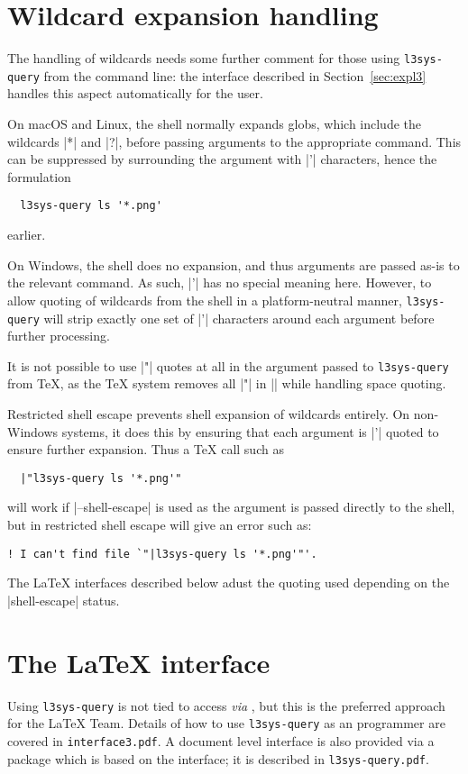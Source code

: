 \documentclass{l3doc}
\begin{document}
\begin{documentation}
\section{Wildcard expansion handling\label{sec:wildcard}}

The handling of wildcards needs some further comment for those using
\texttt{l3sys-query} from the command line: the  interface described
in Section~\ref{sec:expl3} handles this aspect automatically for the user.

On macOS and Linux, the shell normally expands globs, which include the
wildcards |*| and |?|, before passing arguments to the appropriate command.
This can be suppressed by surrounding the argument with |'| characters, hence
the formulation
\begin{verbatim}
  l3sys-query ls '*.png'
\end{verbatim}
earlier.

On Windows, the shell does no expansion, and thus arguments are passed as-is to
the relevant command. As such, |'| has no special meaning here. However, to
allow quoting of wildcards from the shell in a platform-neutral manner,
\texttt{l3sys-query} will strip exactly one set of |'| characters around each
argument before further processing.

It is not possible to use |"| quotes at all in the argument passed to
\texttt{l3sys-query} from \TeX{}, as the \TeX{} system removes all |"| in
|| while handling space quoting.

Restricted shell escape prevents shell expansion of wildcards entirely. On
non-Windows systems, it does this by ensuring that each argument is |'| quoted
to ensure further expansion. Thus a \TeX{} call such as
\begin{verbatim}
  |"l3sys-query ls '*.png'"
\end{verbatim}
will work if |--shell-escape| is used as the argument is passed directly to the
shell, but in restricted shell escape will give an error such as:
\begin{verbatim}
! I can't find file `"|l3sys-query ls '*.png'"'.
\end{verbatim}
The \LaTeX{} interfaces described below adust the quoting used depending on the
|shell-escape| status.

\section{The \LaTeX{} interface\label{sec:expl3}}

Using \texttt{l3sys-query} is not tied to access \emph{via} , but
this is the preferred approach for the \LaTeX{} Team. Details of how to use
\texttt{l3sys-query} as an  programmer are covered in
\texttt{interface3.pdf}. A document level interface is also provided via a
 package which is based on the  interface; it is
described in \texttt{l3sys-query.pdf}.

\end{documentation}

\PrintIndex
\end{document}
